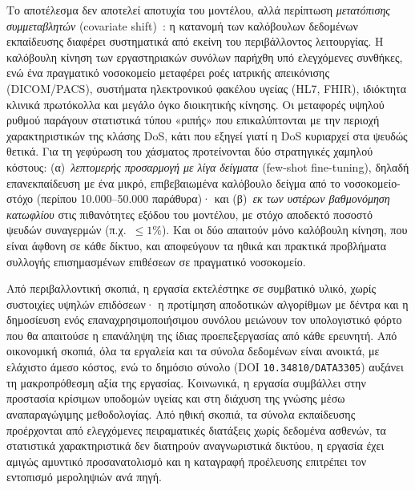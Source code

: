 Το αποτέλεσμα δεν αποτελεί αποτυχία του μοντέλου, αλλά περίπτωση \textit{μετατόπισης συμμεταβλητών} (covariate shift)~\cite{sommer2010outside}: η κατανομή των καλόβουλων δεδομένων εκπαίδευσης διαφέρει συστηματικά από εκείνη του περιβάλλοντος λειτουργίας. Η καλόβουλη κίνηση των εργαστηριακών συνόλων παρήχθη υπό ελεγχόμενες συνθήκες, ενώ ένα πραγματικό νοσοκομείο μεταφέρει ροές ιατρικής απεικόνισης (DICOM/PACS), συστήματα ηλεκτρονικού φακέλου υγείας (HL7, FHIR), ιδιόκτητα κλινικά πρωτόκολλα και μεγάλο όγκο διοικητικής κίνησης. Οι μεταφορές υψηλού ρυθμού παράγουν στατιστικά τύπου «ριπής» που επικαλύπτονται με την περιοχή χαρακτηριστικών της κλάσης DoS, κάτι που εξηγεί γιατί η DoS κυριαρχεί στα ψευδώς θετικά. Για τη γεφύρωση του χάσματος προτείνονται δύο στρατηγικές χαμηλού κόστους: (α)~\textit{λεπτομερής προσαρμογή με λίγα δείγματα} (few-shot fine-tuning), δηλαδή επανεκπαίδευση με ένα μικρό, επιβεβαιωμένα καλόβουλο δείγμα από το νοσοκομείο-στόχο (περίπου 10.000--50.000 παράθυρα)· και (β)~\textit{εκ των υστέρων βαθμονόμηση κατωφλίου} στις πιθανότητες εξόδου του μοντέλου, με στόχο αποδεκτό ποσοστό ψευδών συναγερμών (π.χ.\ $\leq 1\%$). Και οι δύο απαιτούν μόνο καλόβουλη κίνηση, που είναι άφθονη σε κάθε δίκτυο, και αποφεύγουν τα ηθικά και πρακτικά προβλήματα συλλογής επισημασμένων επιθέσεων σε πραγματικό νοσοκομείο.


Από περιβαλλοντική σκοπιά, η εργασία εκτελέστηκε σε συμβατικό υλικό, χωρίς συστοιχίες υψηλών επιδόσεων· η προτίμηση αποδοτικών αλγορίθμων με δέντρα και η δημοσίευση ενός επαναχρησιμοποιήσιμου συνόλου μειώνουν τον υπολογιστικό φόρτο που θα απαιτούσε η επανάληψη της ίδιας προεπεξεργασίας από κάθε ερευνητή. Από οικονομική σκοπιά, όλα τα εργαλεία και τα σύνολα δεδομένων είναι ανοικτά, με ελάχιστο άμεσο κόστος, ενώ το δημόσιο σύνολο (DOI \texttt{10.34810/DATA3305}) αυξάνει τη μακροπρόθεσμη αξία της εργασίας. Κοινωνικά, η εργασία συμβάλλει στην προστασία κρίσιμων υποδομών υγείας και στη διάχυση της γνώσης μέσω αναπαραγώγιμης μεθοδολογίας. Από ηθική σκοπιά, τα σύνολα εκπαίδευσης προέρχονται από ελεγχόμενες πειραματικές διατάξεις χωρίς δεδομένα ασθενών, τα στατιστικά χαρακτηριστικά δεν διατηρούν αναγνωριστικά δικτύου, η εργασία έχει αμιγώς αμυντικό προσανατολισμό και η καταγραφή προέλευσης επιτρέπει τον εντοπισμό μεροληψιών ανά πηγή.


